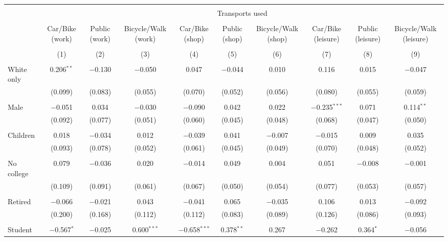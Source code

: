 
\begin{tabular}{@{\extracolsep{5pt}}lccccccccc} 
\\[-1.8ex]\hline 
\hline \\[-1.8ex] 
 & \multicolumn{9}{c}{Transports used} \\ 
\cline{2-10} 
\\[-1.8ex] & Car/Bike (work) & Public (work) & Bicycle/Walk (work) & Car/Bike (shop) & Public (shop) & Bicycle/Walk (shop) & Car/Bike (leisure) & Public (leisure) & Bicycle/Walk (leisure) \\ 
\\[-1.8ex] & (1) & (2) & (3) & (4) & (5) & (6) & (7) & (8) & (9)\\ 
\hline \\[-1.8ex] 
 White only & 0.206$^{**}$ & $-$0.130 & $-$0.050 & 0.047 & $-$0.044 & 0.010 & 0.116 & 0.015 & $-$0.047 \\ 
  & (0.099) & (0.083) & (0.055) & (0.070) & (0.052) & (0.056) & (0.080) & (0.055) & (0.059) \\ 
  & & & & & & & & & \\ 
 Male & $-$0.051 & 0.034 & $-$0.030 & $-$0.090 & 0.042 & 0.022 & $-$0.235$^{***}$ & 0.071 & 0.114$^{**}$ \\ 
  & (0.092) & (0.077) & (0.051) & (0.060) & (0.045) & (0.048) & (0.068) & (0.047) & (0.050) \\ 
  & & & & & & & & & \\ 
 Children & 0.018 & $-$0.034 & 0.012 & $-$0.039 & 0.041 & $-$0.007 & $-$0.015 & 0.009 & 0.035 \\ 
  & (0.093) & (0.078) & (0.052) & (0.061) & (0.045) & (0.049) & (0.070) & (0.048) & (0.052) \\ 
  & & & & & & & & & \\ 
 No college & 0.079 & $-$0.036 & 0.020 & $-$0.014 & 0.049 & 0.004 & 0.051 & $-$0.008 & $-$0.001 \\ 
  & (0.109) & (0.091) & (0.061) & (0.067) & (0.050) & (0.054) & (0.077) & (0.053) & (0.057) \\ 
  & & & & & & & & & \\ 
 Retired & $-$0.066 & $-$0.021 & 0.043 & $-$0.041 & 0.065 & $-$0.035 & 0.106 & 0.013 & $-$0.092 \\ 
  & (0.200) & (0.168) & (0.112) & (0.112) & (0.083) & (0.089) & (0.126) & (0.086) & (0.093) \\ 
  & & & & & & & & & \\ 
 Student & $-$0.567$^{*}$ & $-$0.025 & 0.600$^{***}$ & $-$0.658$^{***}$ & 0.378$^{**}$ & 0.267 & $-$0.262 & 0.364$^{*}$ & $-$0.056 \\ 

\end{tabular}
